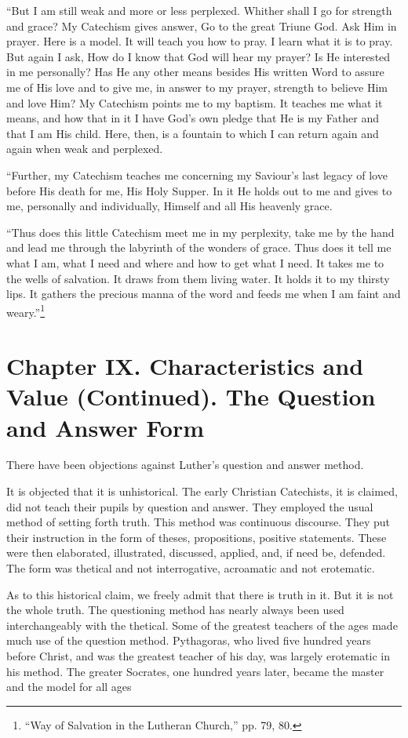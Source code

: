 “But I am still weak and more or less perplexed. Whither shall I go for strength and grace? My
Catechism gives answer, Go to the great Triune God. Ask Him in prayer. Here is a model. It will teach you how to pray. I learn what it is to pray. But again I ask, How do I know that God will hear my prayer? Is He interested in me personally? Has He any other means besides His written Word to assure me of His love and to give me, in answer to my prayer, strength to believe Him and love Him? My Catechism points me to my baptism. It teaches me what it means, and how that in it I have God’s own pledge that He is my Father and that I am His child. Here, then, is a fountain to which I can return again and again when weak and perplexed.

“Further, my Catechism teaches me concerning my Saviour’s last legacy of love before His death for me, His Holy Supper. In it He holds out to me and gives to me, personally and individually, Himself and all His heavenly grace.

“Thus does this little Catechism meet me in my perplexity, take me by the hand and lead me through the labyrinth of the wonders of grace. Thus does it tell me what I am, what I need and where and how to get what I need. It takes me to the wells of salvation. It draws from them living water. It holds it to my thirsty lips. It gathers the precious manna of the word and feeds me when I am faint and weary.”\footnote{“Way of Salvation in the Lutheran Church,” pp. 79, 80.}
\chapter[Chapter IX. The Question and Answer Form]{Chapter IX. Characteristics and Value (Continued). The Question and Answer Form}

There have been objections against Luther’s question and answer method.

It is objected that it is unhistorical. The early Christian Catechists, it is claimed, did not teach their pupils by question and answer.  They employed the usual method of setting forth truth. This method was continuous discourse. They put their instruction in the form of theses, propositions, positive statements. These were then elaborated, illustrated, discussed, applied, and, if need be, defended. The form was thetical and not interrogative, acroamatic and not erotematic.

As to this historical claim, we freely admit that there is truth in it. But it is not the whole truth.  The questioning method has nearly always been used interchangeably with the thetical. Some of the greatest teachers of the ages made much use of the question method. Pythagoras, who lived five hundred years before Christ, and was the greatest teacher of his day, was largely erotematic in his method. The greater Socrates, one hundred years later, became the master and the model for all ages

